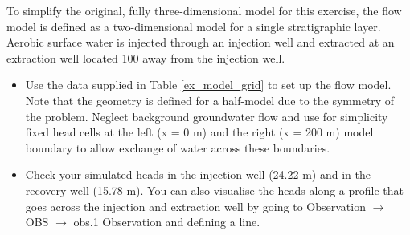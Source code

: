 To simplify the original, fully three-dimensional model for this exercise, 
the flow model is defined as a two-dimensional model for a single stratigraphic layer. Aerobic surface water is injected through an injection well and extracted 
at an extraction well located 100 away from the injection well. 

\begin{itemize}

\item Use the data supplied in Table \ref{ex_model_grid} to set up the flow model. 
Note that the geometry is defined for a half-model due to the symmetry of the problem.
Neglect background groundwater flow and use for simplicity fixed head cells at the left 
(x = 0 m) and the right (x = 200 m) model boundary to allow 
exchange of water across these boundaries.

\item Check your simulated heads in the injection well (24.22 m) and in the recovery well (15.78 m).
You can also visualise the heads along a profile that goes across the injection and extraction well
by going to
{\color{blue}Observation} $\rightarrow$ {\color{blue}OBS} $\rightarrow$ {\color{blue}obs.1 Observation} 
and defining a line. 

\end{itemize}

